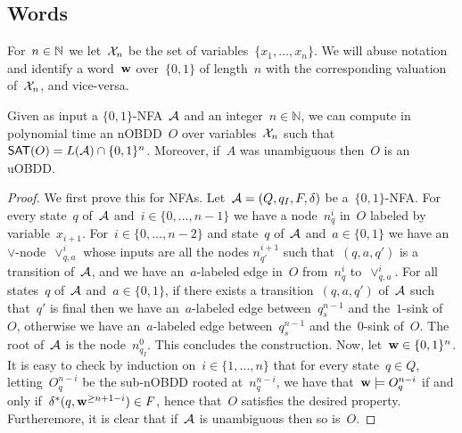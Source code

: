\subsection{Words}
For~$n\in \mathbb{N}$ we let~$\mathcal{X}_n$ be the set of variables~$\{x_1,\ldots,x_n\}$.  We
will abuse notation and identify a word~$\mathbf{w}$ over~$\{0,1\}$ of length~$n$ with
the corresponding valuation of~$\mathcal{X}_n$, and vice-versa.

\begin{proposition}[Folklore]
\label{prp:from-ufas-to-uobdds}
Given as input a $\{0,1\}$-NFA~$\mathcal{A}$ and an integer~$n\in \mathbb{N}$, we can compute in polynomial time
an nOBDD~$O$ over variables~$\mathcal{X}_n$ such that $\mathsf{SAT}(O) = L(\mathcal{A}) \cap \{0,1\}^n$.
Moreover, if~$A$ was unambiguous then~$O$ is an uOBDD.
\end{proposition}
\begin{proof}
We first prove this for NFAs. Let~$\mathcal{A} = (Q,q_I,F,\delta)$ be a~$\{0,1\}$-NFA.
For every state~$q$ of~$\mathcal{A}$ and~$i\in \{0,\ldots,n-1\}$ we have a node~$n_q^i$
in~$O$ labeled by variable~$x_{i+1}$.  For~$i\in \{0,\ldots,n-2\}$ and
state~$q$ of~$\mathcal{A}$ and~$a \in \{0,1\}$ we have an~$\lor$-node~$\lor_{q,a}^i$
whose inputs are all the nodes $n_{q'}^{i+1}$ such that~$(q,a,q')$ is a
transition of~$\mathcal{A}$, and we have an~$a$-labeled edge in~$O$ from~$n_q^i$
to~$\lor_{q,a}^i$.  For all states~$q$ of~$\mathcal{A}$ and~$a \in \{0,1\}$, if there
exists a transition~$(q,a,q')$ of~$\mathcal{A}$ such that~$q'$ is final then we have
an~$a$-labeled edge between~$q_s^{n-1}$ and the~$1$-sink of~$O$, otherwise we
have an~$a$-labeled edge between~$q_s^{n-1}$ and the~$0$-sink of~$O$. The root
of~$\mathcal{A}$ is the node~$n_{q_I}^0$. This concludes the construction. Now, let~$\mathbf{w}
\in \{0,1\}^n$.  It is easy to check by induction on~$i \in \{1,\ldots,n\}$
that for every state~$q \in Q$, letting~$O_q^{n-i}$ be the sub-nOBDD rooted
at~$n_q^{n-i}$, we have that~$\mathbf{w} \models O_q^{n-i}$ if and only
if~$\delta^*(q,\mathbf{w}^{\geq n+1-i}) \in F$, hence that~$O$ satisfies the desired
property.  
Furtheremore, it is clear that if~$\mathcal{A}$ is unambiguous then so is~$O$.
\end{proof}


